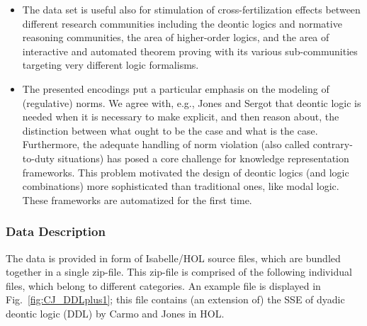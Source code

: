\documentclass{article}
\newcommand{\comment}[1]{
}
\begin{document}
\begin{itemize}
\item The data set is useful also for stimulation of
  cross-fertilization effects between different research communities including
  the deontic logics  and normative reasoning communities,
  the area of higher-order logics, and the area of  interactive
  and automated theorem proving with its various sub-communities targeting
  very different logic formalisms.

\item The presented encodings put a particular emphasis on the
  modeling of (regulative) norms. We agree with, e.g., Jones and
  Sergot \cite{Jones1992-JONDLI} that deontic logic is needed when it is necessary to make
  explicit, and then reason about, the distinction between what ought
  to be the case and what is the case. Furthermore, the adequate
  handling of norm violation (also called contrary-to-duty situations)
  has posed a core challenge for knowledge representation
  frameworks. This problem motivated the design of deontic logics (and logic combinations) more sophisticated than traditional ones, like modal logic. These frameworks are automatized for the first time. 


\end{itemize}

\comment{
[Provide 3-6 bullet points explaining why these data are of value to the scientific community. Bullet points 1-3 must specifically answer the question in red next to the bullet point, but do not include the question itself in your answer (i.e. for the first bullet, you should explain why these data are useful but delete the “Why are these data useful?” question text itself). You may provide up to 3 additional bullet points to outline the value of these data. Please keep points brief.
·	Why are these data useful?
·	Who can benefit from these data?
·	How can these data be used for further insights and development of experiments?
·	 What is the additional value of these data?
·	…
·	…]
}

\subsubsection*{Data Description}
The data is provided in form of Isabelle/HOL source files, which are
bundled together in a single zip-file. This zip-file is comprised of
the following individual files, which belong to different
categories. An example file is displayed in Fig.~\ref{fig:CJ_DDLplus1}; this
file contains (an extension of) the SSE of 
 dyadic deontic logic (DDL) by Carmo and Jones \cite{CJ13} in HOL. 
\end{document}
